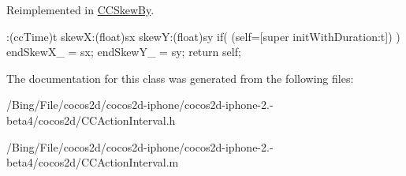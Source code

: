 Reimplemented in \hyperlink{interface_c_c_skew_by_ad325540195e7da22ea15abd163c7c7fb}{C\-C\-Skew\-By}.


\begin{DoxyCode}
                      :(ccTime)t skewX:(float)sx skewY:(float)sy
{
        if( (self=[super initWithDuration:t]) ) {
                endSkewX_ = sx;
                endSkewY_ = sy;
        }
        return self;
}
\end{DoxyCode}


The documentation for this class was generated from the following files\-:\begin{DoxyCompactItemize}
\item 
/\-Bing/\-File/cocos2d/cocos2d-\/iphone/cocos2d-\/iphone-\/2.-\/beta4/cocos2d/C\-C\-Action\-Interval.\-h\item 
/\-Bing/\-File/cocos2d/cocos2d-\/iphone/cocos2d-\/iphone-\/2.-\/beta4/cocos2d/C\-C\-Action\-Interval.\-m\end{DoxyCompactItemize}
